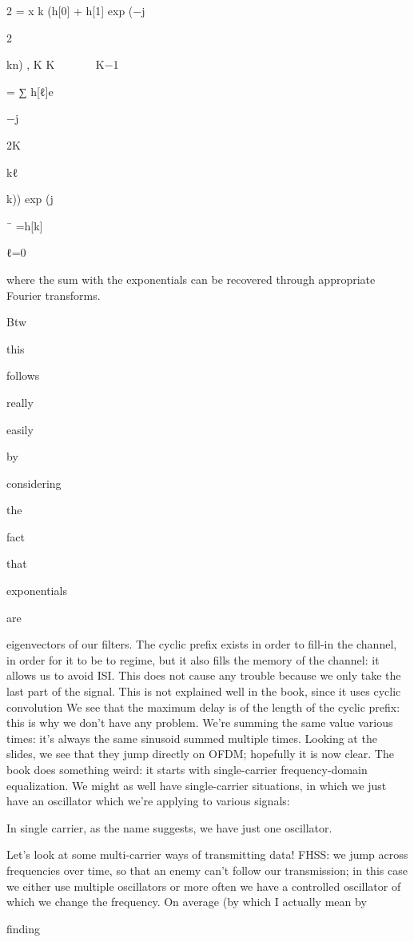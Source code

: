 {2\pi
= x k (h[0] + h[1] exp (−j

2\pi

kn) ,
K K





K−1

= ∑ h[ℓ]e

−j

2\pi K

kℓ

k)) exp (j

¯
=h[k]

ℓ=0

where the sum with the exponentials can be recovered through appropriate Fourier transforms.

Btw

this

follows

really

easily

by

considering

the

fact

that

exponentials

are

eigenvectors of our filters.
The cyclic prefix exists in order to fill-in the channel, in order for it to be to regime, but it also fills the memory of the channel: it allows us to avoid ISI.
This does not cause any trouble because we only take the last part of the signal.
This is not explained well in the book, since it uses cyclic convolution We see that the maximum delay is of the length of the cyclic prefix: this is why we don't have any problem.
We're summing the same value various times: it's always the same sinusoid summed multiple times.
Looking at the slides, we see that they jump directly on OFDM; hopefully it is now clear.
The book does something weird: it starts with single-carrier frequency-domain equalization.
We might as well have single-carrier situations, in which we just have an oscillator which we're applying to various signals:

In single carrier, as the name suggests, we have just one oscillator.

Let's look at some multi-carrier ways of transmitting data!
FHSS: we jump across frequencies over time, so that an enemy can't follow our transmission; in this case we either use multiple oscillators or more often we have a controlled oscillator of which we change the frequency.
On average (by which I actually mean by

finding

}

